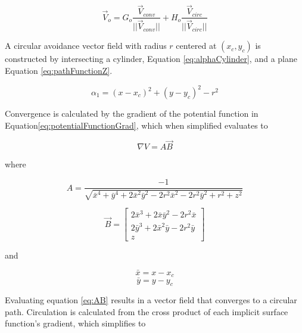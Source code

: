 \documentclass[numbered,pdftex]{ohio-etd}
\begin{document}
\begin{equation}
\overrightarrow{V}_{o} = G_o\frac{\overrightarrow{V}_{conv}}{||\overrightarrow{V}_{conv}||}+H_o\frac{\overrightarrow{V}_{circ}}{||\overrightarrow{V}_{circ}||}
\label{eq:obstComponents}
\end{equation}



A circular avoidance vector field with radius $r$ centered at $(x_c,y_c)$ is constructed by intersecting a cylinder, Equation \ref{eq:alphaCylinder}, and a plane Equation \ref{eq:pathFunctionZ}. 

\begin{equation}\label{eq:alphaCylinder}
\alpha_1 = (x-x_c)^2 + (y-y_c)^2-r^2
\end{equation}


Convergence is calculated by the gradient of the potential function in Equation\ref{eq:potentialFunctionGrad}, which when simplified evaluates to

\begin{equation}
\nabla V = A\overrightarrow{B}
\label{eq:AB}
\end{equation}

\noindent
where


\begin{equation}
A = \dfrac{-1}{\sqrt{\bar{x}^4+\bar{y}^4+2\bar{x}^2\bar{y}^2-2r^2\bar{x}^2-2r^2\bar{y}^2+r^2+z^2}}
\end{equation}

\begin{equation}
\overrightarrow{B} = \begin{bmatrix} 2\bar{x}^3+2\bar{x}\bar{y}^2-2r^2\bar{x} \\ 2\bar{y}^3+2\bar{x}^2\bar{y}-2r^2\bar{y} \\z \end{bmatrix}
\end{equation}

\noindent
and


\begin{equation}
\bar{x} = x - x_c
\end{equation}
\begin{equation}
\bar{y} = y - y_c
\end{equation}


Evaluating equation \ref{eq:AB} results in a vector field that converges to a circular path. Circulation is calculated from the cross product of each implicit surface function's gradient, which simplifies to
\end{document}
